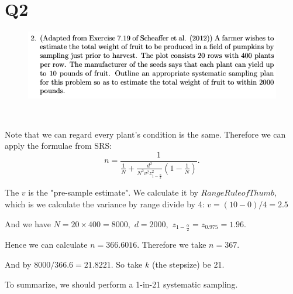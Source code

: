 \documentclass[12pt]{article}%
\begin{document}
\newpage
\section{Q2}
\begin{figure}[htp]
    \centering %
    \includegraphics[width = 15cm]{img/Q2.png}
\end{figure}

~\ 

Note that we can regard every plant's condition is the same. Therefore we can apply the 
formulae from SRS: $$n=\frac{1}{\frac{1}{N} + 
\frac{d^2}{N^2v^2z_{1-\frac{\alpha}{2}}^2}(1-\frac{1}{N})}.$$

The $v$ is the "pre-sample estimate". We calculate it by $Range Rule of Thumb$, which is 
we calculate the variance by range divide by 4: $v=(10-0)/4=2.5$

And we have $N=20\times 400 = 8000,$ $d=2000,$ $z_{1-\frac{\alpha}{2}}=z_{0.975}=1.96.$

Hence we can calculate $n=366.6016.$ Therefore we take $n=367.$

And by $8000/366.6=21.8221.$ So take $k$ (the stepsize) be 21. 

To summarize, we should perform a 1-in-21 systematic sampling.


\newpage
\end{document}
